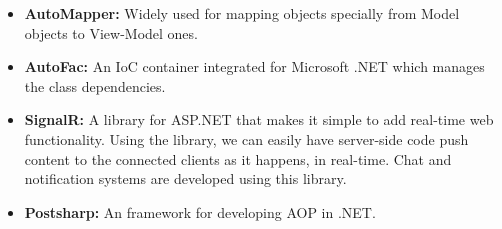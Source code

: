 \begin{itemize}
	\item \textbf{AutoMapper:} Widely used for mapping objects specially from Model objects to View-Model ones.
	\item \textbf{AutoFac:} An IoC container integrated for Microsoft .NET which manages the class dependencies.
	\item \textbf{SignalR:} A library for ASP.NET that makes it simple to add real-time web functionality. Using the library, we can easily have server-side code push content to the connected clients as it happens, in real-time. Chat and notification systems are developed using this library.
	\item \textbf{Postsharp:} An framework for developing AOP in .NET.
\end{itemize}